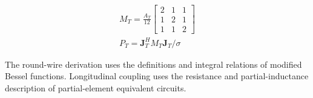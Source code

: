 \hypertarget{S1.equation.E09}{}
\hypertarget{E09}{}
\begin{equation}
\begin{gathered}
M_T=\frac{A_T}{12}\begin{bmatrix}2&1&1\\1&2&1\\1&1&2\end{bmatrix} \\
P_T=\mathbf J_T^H M_T\mathbf J_T/\sigma
\end{gathered}
\tag{8}\label{eq:E09}
\end{equation}

\hypertarget{S1.method.sources}{}
The round-wire derivation uses the definitions and integral relations of modified Bessel functions. Longitudinal coupling uses the resistance and partial-inductance description of partial-element equivalent circuits. \cite{BESSEL,RUEHLI1974}
